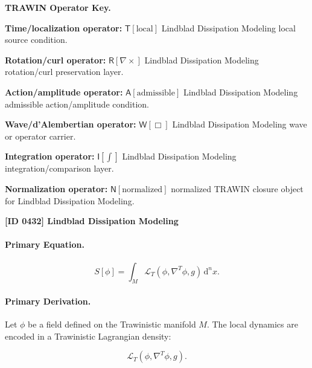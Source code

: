 \par\vspace{0.45\baselineskip}
\noindent\begin{minipage}[t]{\linewidth}
\begingroup
\small
\raggedright
\textbf{TRAWIN Operator Key.}\par
\noindent\textbf{Time/localization operator:} $\mathsf{T}\!\left[\mathrm{local}\right]$ Lindblad Dissipation Modeling local source condition.\par
\noindent\textbf{Rotation/curl operator:} $\mathsf{R}\!\left[\nabla\times\right]$ Lindblad Dissipation Modeling rotation/curl preservation layer.\par
\noindent\textbf{Action/amplitude operator:} $\mathsf{A}\!\left[\mathrm{admissible}\right]$ Lindblad Dissipation Modeling admissible action/amplitude condition.\par
\noindent\textbf{Wave/d'Alembertian operator:} $\mathsf{W}\!\left[\Box\right]$ Lindblad Dissipation Modeling wave or operator carrier.\par
\noindent\textbf{Integration operator:} $\mathsf{I}\!\left[\int\right]$ Lindblad Dissipation Modeling integration/comparison layer.\par
\noindent\textbf{Normalization operator:} $\mathsf{N}\!\left[\mathrm{normalized}\right]$ normalized TRAWIN closure object for Lindblad Dissipation Modeling.\par
\endgroup
\end{minipage}

\clearpage
\noindent\textbf{[ID 0432] Lindblad Dissipation Modeling}\par
\vspace{0.35em}
\paragraph{Primary Equation.}
\begin{equation}
S[\phi]
=
\int_M
\mathcal{L}_T
\left(
\phi,\nabla^T\phi,g
\right)
\,\mathrm{d}^n x .
\end{equation}

\paragraph{Primary Derivation.}
Let $\phi$ be a field defined on the Trawinistic manifold $M$.  
The local dynamics are encoded in a Trawinistic Lagrangian density:

\begin{equation}
\mathcal{L}_T
\left(
\phi,\nabla^T\phi,g
\right).
\end{equation}

